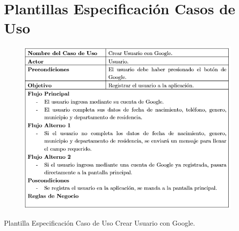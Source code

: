 \documentclass[12pt,letterpaper,openany]{book}
\begin{document}

\chapter{Plantillas Especificación Casos de Uso}\label{aped.B}


\begin{table}[H]
\begin{center}
\begin{figure}[H]
\begin{center}
\includegraphics[width=13cm]{./imagenes/PCU/crear_usuario_google}
\end{center}
\end{figure}
\end{center}
\caption{Plantilla Especificación Caso de Uso Crear Usuario con Google.}
\end{table}
\end{document}
